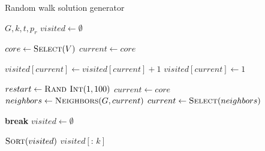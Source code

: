 \begin{algorithm}
  \caption{Random walk solution generator}\label{alg:RANDOM-WALK-SMART-INIT}
  \begin{algorithmic}[1]
    \Require $G, k, t, p_r$
    \State $visited \leftarrow \emptyset$

    \State $core \leftarrow \Call{Select}{V}$
    \State $current \leftarrow core$

    \State $visited\left[current\right] \leftarrow visited\left[current\right] + 1$
    \Else
    \State $visited\left[current\right] \leftarrow 1$
    \EndIf

    \State $restart \leftarrow \Call{Rand Int}{1, 100}$
    \State $current \leftarrow core$
    \Else
    \State $neighbors \leftarrow \Call{Neighbors}{G, current}$
    \State $current \leftarrow \Call{Select}{neighbors}$
    \EndIf
    \EndFor

    \State \textbf{break}
    \Else
    \State $visited \leftarrow \emptyset$
    \EndIf
    \EndWhile

    \State $\Call{Sort}{visited}$
    \State \Return $visited\left[ {:}\,k \right]$
  \end{algorithmic}
\end{algorithm}
